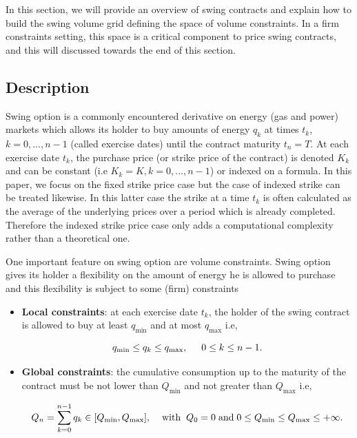 \documentclass{article}
\numberwithin{equation}{section}
\begin{document}
\indent

In this section, we will provide an overview of swing contracts and explain how to build the swing volume grid defining the space of volume constraints. In a firm constraints setting, this space is a critical component to price swing contracts, and this will discussed towards the end of this section.


\subsection{Description}

\indent

Swing option is a commonly encountered derivative on energy (gas and power) markets which allows its holder to buy amounts of energy $q_{k}$ at times $t_k$, $k = 0, ...,n-1$ (called exercise dates) until the contract maturity $t_n = T$. At each exercise date $t_k$, the purchase price (or strike price of the contract) is denoted $K_k$ and can be constant (i.e $K_k = K, k = 0,...,n-1$) or indexed on a formula. In this paper, we focus on the fixed strike price case but the case of indexed strike can be treated likewise. In this latter case the strike at a time $t_k$ is often calculated as the average of the underlying prices over a period which is already completed. Therefore the indexed strike price case only adds a computational complexity rather than a theoretical one.


One important feature on swing option are volume constraints. Swing option gives its holder a flexibility on the amount of energy he is allowed to purchase and this flexibility is subject to some (firm) constraints

\begin{itemize}
    \item \textbf{Local constraints}: at each exercise date $t_k$, the holder of the swing contract is allowed to buy at least $q_{\min}$ and at most $q_{\max}$ i.e,
    
    \begin{equation}
    \label{loc_const}
    q_{\min} \le q_{k} \le q_{\max}, \hspace{0.5cm} 0 \le k \le n-1.
    \end{equation}
    
    
    \item \textbf{Global constraints}: the cumulative consumption up to the maturity of the contract must be not lower than $Q_{\min}$ and not greater than $Q_{\max}$ i.e,
    
    \begin{equation}
    \label{glob_const}
    Q_{n} = \sum_{k = 0}^{n-1} q_{k} \in [Q_{\min}, Q_{\max}], \hspace{0.4cm} \text{with} \hspace{0.2cm} Q_0 = 0 \hspace{0.1cm} \text{and} \hspace{0.1cm} 0 \le Q_{\min} \le Q_{\max} \le +\infty.
    \end{equation}

\end{itemize}
\end{document}
